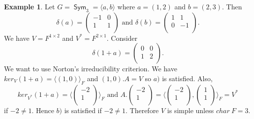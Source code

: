 \documentclass[12pt]{amsart}
\theoremstyle{definition}
\newtheorem{example}[theorem]{Example}
\DeclareMathOperator{\Sym}{\mathsf{Sym}}
\begin{document}
\begin{example}
Let $G=\Sym_3=\langle a, b\rangle$ where $a=(1,2)$ and $b=(2,3)$.  Then
$$\delta(a)=\left(\begin{array}{cc}
-1  & 0 \\
1 & 1 \\
\end{array}\right)
\textrm{ and }
\delta(b)=\left(\begin{array}{cc}
1  & 1 \\
0 & -1 \\
\end{array}\right).$$
We have $V=F^{1\times 2}$ and $V^*=F^{2\times 1}$.  Consider
$$\delta(1+a)=\left(\begin{array}{cc}
0  & 0 \\
1 & 2 \\
\end{array}\right).$$
We want to use Norton's irreducibility criterion.  We have $ker_V(1+a)=\langle(1,0)\rangle_F$ and $(1,0).A=V$ so $a)$ is satisfied.  Also,
$$ker_{V^*}(1+a)=\langle\left(\begin{array}{c} -2 \\ 1 \\ \end{array}\right)\rangle_F\textrm{ and }A.\left(\begin{array}{c} -2 \\ 1 \\ \end{array}\right)=\langle\left(\begin{array}{c} -2 \\ 1 \\ \end{array}\right), \left(\begin{array}{c} 1 \\ 1 \\ \end{array}\right)\rangle_F=V^*$$
if $-2\neq 1$. Hence $b)$ is satisfied if $-2\neq 1$.  Therefore $V$ is simple unless $char\ F=3$.
\end{example}

\nocite{*}




\end{document}
